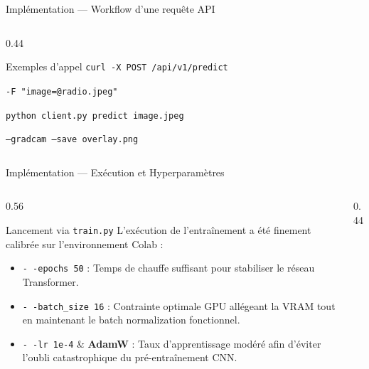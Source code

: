 \begin{frame}[t]{Implémentation — Workflow d'une requête API}
\begin{columns}[T,onlytextwidth]
\begin{column}{0.44\textwidth}
\begin{block}{Exemples d'appel}
\vspace{0.1cm}
\texttt{curl -X POST /api/v1/predict}

\vspace{0.03cm}
\texttt{-F "image=@radio.jpeg"}

\vspace{0.1cm}
\texttt{python client.py predict image.jpeg}

\vspace{0.03cm}
\texttt{--gradcam --save overlay.png}
\end{block}
\end{column}
\end{columns}
\end{frame}

\begin{frame}[t]{Implémentation — Exécution et Hyperparamètres}
\vspace*{-0.18cm}
\begin{columns}[T,onlytextwidth]
\begin{column}{0.56\textwidth}
\footnotesize
\setlength{\abovedisplayskip}{3pt}
\setlength{\belowdisplayskip}{3pt}
\begin{block}{Lancement via \texttt{train.py}}
L'exécution de l'entraînement a été finement calibrée sur l'environnement Colab :
\begin{itemize}
\setlength{\itemsep}{0.15em}
\item \texttt{-\,-epochs 50} : Temps de chauffe suffisant pour stabiliser le réseau Transformer.
\item \texttt{-\,-batch\_size 16} : Contrainte optimale GPU allégeant la VRAM tout en maintenant le batch normalization fonctionnel.
\item \texttt{-\,-lr 1e-4} \& \textbf{AdamW} : Taux d'apprentissage modéré afin d'éviter l'oubli catastrophique du pré-entraînement CNN.
\end{itemize}
\end{block}
\end{column}
\begin{column}{0.44\textwidth}
\end{column}
\end{columns}
\end{frame}
